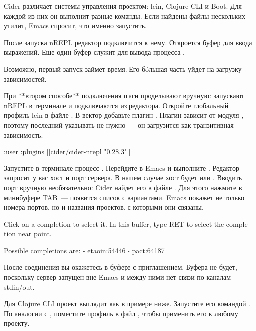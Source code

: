 Cider различает системы управления проектом: lein, Clojure CLI и Boot. Для каждой из них он выполнит разные команды. Если найдены файлы нескольких утилит, Emacs спросит, что именно запустить.

После запуска nREPL редактор подключится к нему. Откроется буфер  для ввода выражений. Еще один буфер  служит для вывода процесса .

Возможно, первый запуск  займет время. Его бóльшая часть уйдет на загрузку зависимостей.

При **втором способе** подключения шаги проделывают вручную: запускают nREPL в терминале и подключаются из редактора. Откройте глобальный профиль lein в файле . В вектор  \arr {} добавьте плагин . Плагин зависит от модуля , поэтому последний указывать не нужно~--- он загрузится как транзитивная зависимость.

\begin{english}
  \begin{clojure}
{:user
 {:plugins
  [[cider/cider-nrepl "0.28.3"]]}}
  \end{clojure}
\end{english}

Запустите в терминале процесс . Перейдите в Emacs и выполните . Редактор запросит у вас хост и порт сервера. В нашем случае хост будет  или . Вводить порт вручную необязательно: Cider найдет его в файле . Для этого нажмите в минибуфере TAB~--- появится список с вариантами. Emacs покажет не только номера портов, но и названия проектов, с которыми они связаны.

\begin{english}
  \begin{text}
Click on a completion to select it.
In this buffer, type RET to select the completion near point.

Possible completions are:
- etaoin:54446
- pact:64187
  \end{text}
\end{english}

После соединения вы окажетесь в буфере  с приглашением. Буфера  не будет, поскольку сервер запущен вне Emacs и между ними нет связи по каналам stdin/out.

Для Clojure CLI проект выглядит как в примере ниже. Запустите его командой . По аналогии с , поместите профиль  в файл , чтобы применить его к любому проекту.

